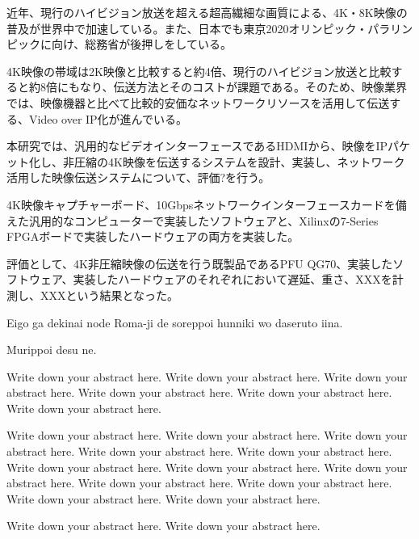 
\begin{jabstract}

近年、現行のハイビジョン放送を超える超高繊細な画質による、4K・8K映像の普及が世界中で加速している。また、日本でも東京2020オリンピック・パラリンピックに向け、総務省が後押しをしている。

4K映像の帯域は2K映像と比較すると約4倍、現行のハイビジョン放送と比較すると約8倍にもなり、伝送方法とそのコストが課題である。そのため、映像業界では、映像機器と比べて比較的安価なネットワークリソースを活用して伝送する、Video over IP化が進んでいる。

本研究では、汎用的なビデオインターフェースであるHDMIから、映像をIPパケット化し、非圧縮の4K映像を伝送するシステムを設計、実装し、ネットワーク活用した映像伝送システムについて、評価?を行う。%

4K映像キャプチャーボード、10Gbpsネットワークインターフェースカードを備えた汎用的なコンピューターで実装したソフトウェアと、Xilinxの7-Series FPGAボードで実装したハードウェアの両方を実装した。

評価として、4K非圧縮映像の伝送を行う既製品であるPFU QG70、実装したソフトウェア、実装したハードウェアのそれぞれにおいて遅延、重さ、XXXを計測し、XXXという結果となった。

\end{jabstract}


\begin{eabstract}

Eigo ga dekinai node Roma-ji de soreppoi hunniki wo daseruto iina.

Murippoi desu ne.

Write down your abstract here. Write down your abstract here. Write down your abstract here. Write down your abstract here. Write down your abstract here. Write down your abstract here.

 Write down your abstract here. Write down your abstract here. Write down your abstract here. Write down your abstract here. Write down your abstract here. Write down your abstract here. Write down your abstract here. Write down your abstract here. Write down your abstract here. Write down your abstract here. Write down your abstract here. Write down your abstract here.

Write down your abstract here. Write down your abstract here.

\end{eabstract}
